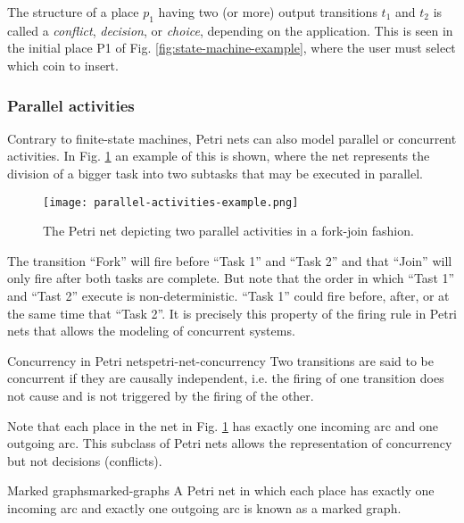 \documentclass[../Thesis.tex]{subfiles}
\begin{document}
The structure of a place $p_1$ having two (or more) output transitions $t_1$ and $t_2$ is called
a \emph{conflict}, \emph{decision}, or \emph{choice}, depending on the application.
This is seen in the initial place \uppercase{P1} of Fig. \ref{fig:state-machine-example},
where the user must select which coin to insert.

\subsubsection{Parallel activities}

Contrary to finite-state machines, Petri nets can also model parallel or concurrent activities.
In Fig. \ref{fig:parallel-activities-example} an example of this is shown,
where the net represents the division of a bigger task
into two subtasks that may be executed in parallel.

\begin{figure}[H]
    \centering
    \texttt{[image: parallel-activities-example.png]}
    \caption{The Petri net depicting two parallel activities in a fork-join fashion.}
    \label{fig:parallel-activities-example}
\end{figure}

The transition ``Fork'' will fire before ``Task 1'' and ``Task 2''
and that ``Join'' will only fire after both tasks are complete.
But note that the order in which ``Tast 1'' and ``Tast 2'' execute is non-deterministic.
``Task 1'' could fire before, after, or at the same time that ``Task 2''.
It is precisely this property of the firing rule in Petri nets
that allows the modeling of concurrent systems.

\begin{definition}{Concurrency in Petri nets}{petri-net-concurrency}
    Two transitions are said to be concurrent if they are causally independent, i.e.
    the firing of one transition does not cause and is not triggered by the firing of the other.
\end{definition}

Note that each place in the net in Fig. \ref{fig:parallel-activities-example}
has exactly one incoming arc and one outgoing arc.
This subclass of Petri nets allows the representation of concurrency but not decisions (conflicts).

\begin{definition}{Marked graphs}{marked-graphs}
    A Petri net in which each place has exactly one incoming arc
    and exactly one outgoing arc is known as a marked graph.
\end{definition}
\end{document}
